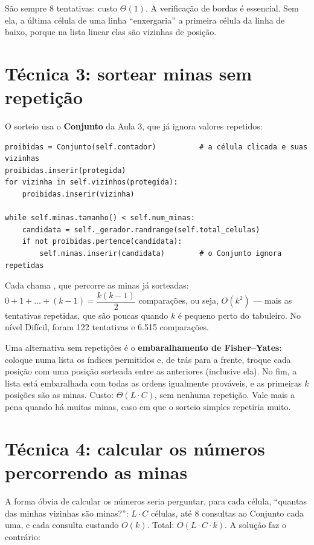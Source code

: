 São sempre 8 tentativas: custo $\Theta(1)$. A verificação de bordas é essencial. Sem ela, a
última célula de uma linha \enquote{enxergaria} a primeira célula da linha de baixo, porque na
lista linear elas são vizinhas de posição.

\section{Técnica 3: sortear minas sem repetição}

O sorteio usa o \textbf{Conjunto} da Aula 3, que já ignora valores repetidos:

\begin{lstlisting}
proibidas = Conjunto(self.contador)          # a célula clicada e suas vizinhas
proibidas.inserir(protegida)
for vizinha in self.vizinhos(protegida):
    proibidas.inserir(vizinha)

while self.minas.tamanho() < self.num_minas:
    candidata = self._gerador.randrange(self.total_celulas)
    if not proibidas.pertence(candidata):
        self.minas.inserir(candidata)        # o Conjunto ignora repetidas
\end{lstlisting}

Cada  chama , que percorre as minas já sorteadas: $0 + 1 +
\dots + (k - 1) = \dfrac{k(k-1)}{2}$ comparações, ou seja, $O(k^2)$ — mais as tentativas
repetidas, que são poucas quando $k$ é pequeno perto do tabuleiro. No nível Difícil, foram 122
tentativas e 6.515 comparações.

\begin{aprofunde}
Uma alternativa sem repetições é o \textbf{embaralhamento de Fisher–Yates}: coloque numa lista os
índices permitidos e, de trás para a frente, troque cada posição com uma posição sorteada entre as
anteriores (inclusive ela). No fim, a lista está embaralhada com todas as ordens igualmente
prováveis, e as primeiras $k$ posições são as minas. Custo: $\Theta(L \cdot C)$, sem nenhuma
repetição. Vale mais a pena quando há muitas minas, caso em que o sorteio simples repetiria muito.
\end{aprofunde}

\section{Técnica 4: calcular os números percorrendo as minas}

A forma óbvia de calcular os números seria perguntar, para cada célula, \enquote{quantas das minhas
vizinhas são minas?}: $L \cdot C$ células, até 8 consultas ao Conjunto cada uma, e cada consulta
custando $O(k)$. Total: $O(L \cdot C \cdot k)$. A solução faz o contrário:

